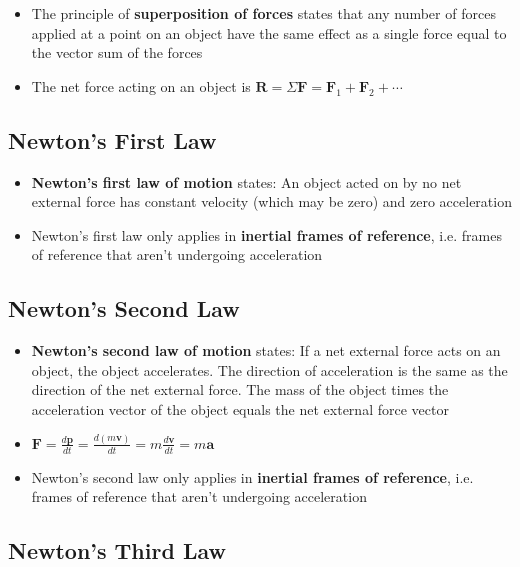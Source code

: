 \documentclass{article}
\begin{document}
\begin{itemize}
  \item The principle of \textbf{superposition of forces} states that any number of forces applied at a point on an object have the same effect as a single force equal to the vector sum of the forces

  \item The net force acting on an object is $\mathbf{R}=\Sigma\mathbf{F}=\mathbf{F}_1+\mathbf{F}_2+\cdots$
\end{itemize}

\subsection{Newton's First Law}

\begin{itemize}
  \item \textbf{Newton's first law of motion} states: An object acted on by no net external force has constant velocity (which may be zero) and zero acceleration

  \item Newton's first law only applies in \textbf{inertial frames of reference}, i.e. frames of reference that aren't undergoing acceleration
\end{itemize}

\subsection{Newton's Second Law}

\begin{itemize}
  \item \textbf{Newton's second law of motion} states: If a net external force acts on an object, the object accelerates. The direction of acceleration is the same as the direction of the net external force. The mass of the object times the acceleration vector of the object equals the net external force vector

  \item $\mathbf{F}=\frac{d\mathbf{p}}{dt}=\frac{d\left(m\mathbf{v}\right)}{dt}=m\frac{d\mathbf{v}}{dt}=m\mathbf{a}$

  \item Newton's second law only applies in \textbf{inertial frames of reference}, i.e. frames of reference that aren't undergoing acceleration
\end{itemize}

\subsection{Newton's Third Law}
\end{document}
